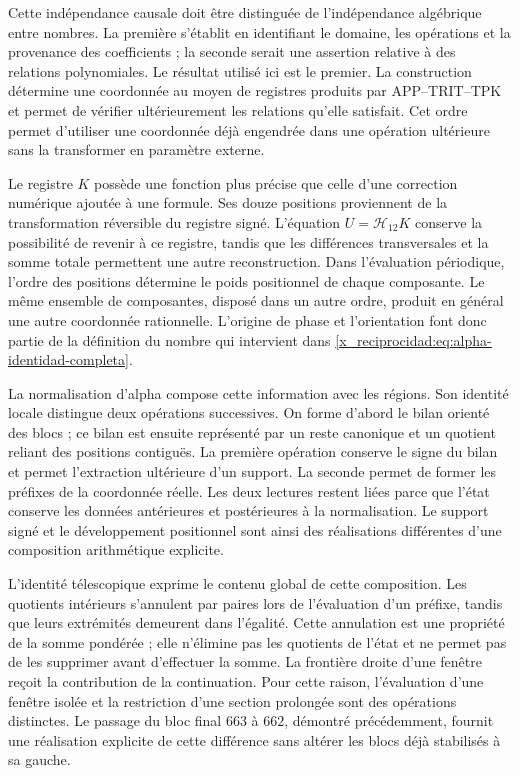 Cette indépendance causale doit être distinguée de l'indépendance algébrique
entre nombres. La première s'établit en identifiant le domaine, les
opérations et la provenance des coefficients ; la seconde serait une
assertion relative à des relations polynomiales. Le résultat utilisé ici est le
premier. La construction détermine une coordonnée au moyen de registres
produits par APP--TRIT--TPK et permet de vérifier ultérieurement les
relations qu'elle satisfait. Cet ordre permet d'utiliser une coordonnée déjà
engendrée dans une opération ultérieure sans la transformer en paramètre externe.

Le registre $K$ possède une fonction plus précise que celle d'une correction
numérique ajoutée à une formule. Ses douze positions proviennent de la
transformation réversible du registre signé. L'équation
$U=\mathcal H_{12}K$ conserve la possibilité de revenir à ce registre,
tandis que les différences transversales et la somme totale permettent une autre
reconstruction. Dans l'évaluation périodique, l'ordre des positions
détermine le poids positionnel de chaque composante. Le même ensemble de
composantes, disposé dans un autre ordre, produit en général une autre coordonnée
rationnelle. L'origine de phase et l'orientation font donc partie de la
définition du nombre qui intervient dans \eqref{x_reciprocidad:eq:alpha-identidad-completa}.

La normalisation d'alpha compose cette information avec les régions. Son
identité locale distingue deux opérations successives. On forme d'abord le
bilan orienté des blocs ; ce bilan est ensuite représenté par
un reste canonique et un quotient reliant des positions contiguës. La première
opération conserve le signe du bilan et permet l'extraction ultérieure
d'un support. La seconde permet de former les préfixes de la coordonnée
réelle. Les deux lectures restent liées parce que l'état conserve les
données antérieures et postérieures à la normalisation. Le support signé et le
développement positionnel sont ainsi des réalisations différentes d'une composition
arithmétique explicite.

L'identité télescopique exprime le contenu global de cette composition.
Les quotients intérieurs s'annulent par paires lors de l'évaluation d'un préfixe,
tandis que leurs extrémités demeurent dans l'égalité. Cette annulation est une
propriété de la somme pondérée ; elle n'élimine pas les quotients de l'état et
ne permet pas de les supprimer avant d'effectuer la somme. La frontière droite d'une
fenêtre reçoit la contribution de la continuation. Pour cette raison,
l'évaluation d'une fenêtre isolée et la restriction d'une section
prolongée sont des opérations distinctes. Le passage du bloc final $663$ à
$662$, démontré précédemment, fournit une réalisation explicite de cette
différence sans altérer les blocs déjà stabilisés à sa gauche.

